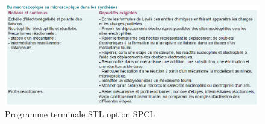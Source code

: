 \documentclass[12pt,prb,aps,epsf]{article}
\begin{document}
\begin{figure}[h]
	\centering \includegraphics[width=18cm]{programme_Tle_SPCL}
	\caption{Programme terminale STL option SPCL}
\end{figure}
\end{document}
